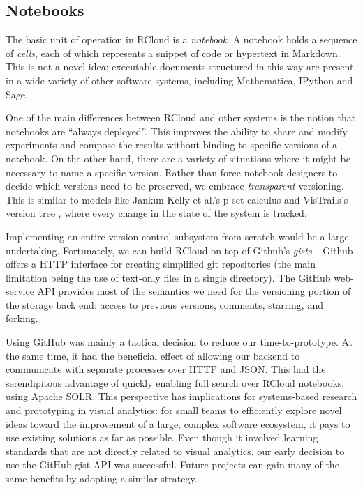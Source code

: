 \subsection{Notebooks\label{sec:notebooks}}

The basic unit of operation in RCloud is a \emph{notebook}. A notebook
holds a sequence of \emph{cells}, each of which represents a
snippet of code or hypertext in Markdown. This is not a novel idea;
executable documents structured in this way are present in a wide
variety of other software systems, including Mathematica, IPython and Sage.

One of the main differences between RCloud and other systems is the
notion that notebooks are ``always deployed''. This improves the
ability to share and modify experiments and compose the results
without binding to specific versions of a notebook.
On the other hand, there are a variety of situations where it might
be necessary to name a specific version. Rather than force notebook
designers to decide which versions need to be preserved,
we embrace \emph{transparent} versioning.
This is similar to models like Jankun-Kelly et al.'s p-set calculus \cite{Jankun-Kelly:2007:MFV}
and VisTrails's version tree \cite{Callahan:2006:VVM}, where every change in the state of the system is tracked.

Implementing an entire version-control subsystem from scratch would
be a large undertaking. Fortunately, we can build RCloud on top of Github's
\emph{gists}~\cite{Github:2014:GG}. Github offers a HTTP interface
for creating simplified git repositories (the main limitation being the
use of text-only files in a single directory). The GitHub web-service
API provides most of the semantics we need for the versioning
portion of the storage back end: access to previous versions,
comments, starring, and forking.

Using GitHub was mainly a tactical decision to reduce our
time-to-prototype. At the same time, it had the beneficial effect of
allowing our backend to communicate with separate processes over HTTP
and JSON. This had the serendipitous advantage of quickly enabling
full search over RCloud notebooks, using Apache SOLR.
%
This perspective has implications for
systems-based research and prototyping in visual analytics:
for small teams to efficiently explore novel ideas toward the
improvement of a large, complex software ecosystem, it pays
to use existing solutions as far as possible.
%
Even though it involved learning standards that are not directly
related to visual analytics, our early decision to use the GitHub
gist API was successful. Future projects can gain many
of the same benefits by adopting a similar strategy.

